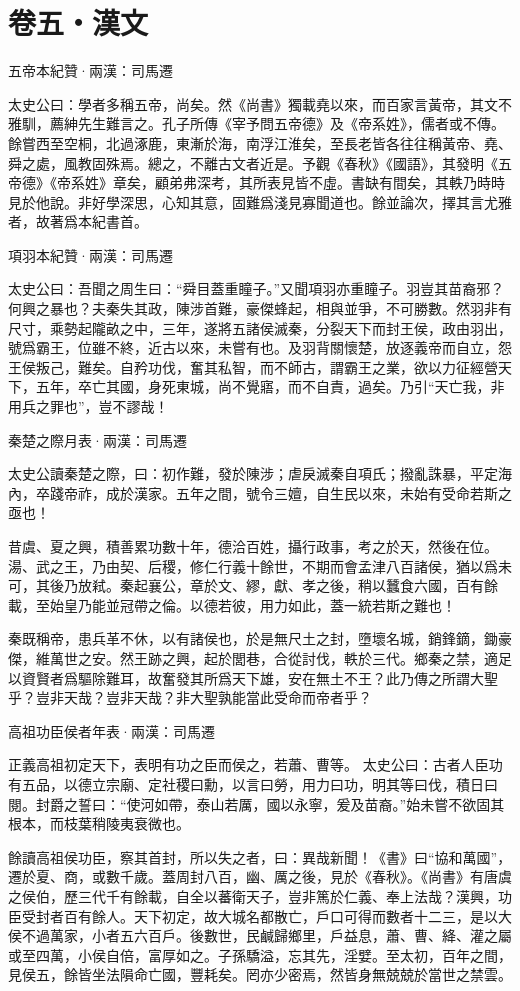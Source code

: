 \documentclass[12pt,a4paper]{ctexbook}
\begin{document}
\section{卷五・漢文}
五帝本紀贊·兩漢：司馬遷 \par
太史公曰：學者多稱五帝，尚矣。然《尚書》獨載堯以來，而百家言黃帝，其文不雅馴，薦紳先生難言之。孔子所傳《宰予問五帝德》及《帝系姓》，儒者或不傳。餘嘗西至空桐，北過涿鹿，東漸於海，南浮江淮矣，至長老皆各往往稱黃帝、堯、舜之處，風教固殊焉。總之，不離古文者近是。予觀《春秋》《國語》，其發明《五帝德》《帝系姓》章矣，顧弟弗深考，其所表見皆不虛。書缺有間矣，其軼乃時時見於他說。非好學深思，心知其意，固難爲淺見寡聞道也。餘並論次，擇其言尤雅者，故著爲本紀書首。\par
項羽本紀贊·兩漢：司馬遷 \par
太史公曰：吾聞之周生曰：“舜目蓋重瞳子。”又聞項羽亦重瞳子。羽豈其苗裔邪？何興之暴也？夫秦失其政，陳涉首難，豪傑蜂起，相與並爭，不可勝數。然羽非有尺寸，乘勢起隴畝之中，三年，遂將五諸侯滅秦，分裂天下而封王侯，政由羽出，號爲霸王，位雖不終，近古以來，未嘗有也。及羽背關懷楚，放逐義帝而自立，怨王侯叛己，難矣。自矜功伐，奮其私智，而不師古，謂霸王之業，欲以力征經營天下，五年，卒亡其國，身死東城，尚不覺寤，而不自責，過矣。乃引“天亡我，非用兵之罪也”，豈不謬哉！\par
秦楚之際月表·兩漢：司馬遷 \par
太史公讀秦楚之際，曰：初作難，發於陳涉；虐戾滅秦自項氏；撥亂誅暴，平定海內，卒踐帝祚，成於漢家。五年之間，號令三嬗，自生民以來，未始有受命若斯之亟也！\par
昔虞、夏之興，積善累功數十年，德洽百姓，攝行政事，考之於天，然後在位。湯、武之王，乃由契、后稷，修仁行義十餘世，不期而會孟津八百諸侯，猶以爲未可，其後乃放弒。秦起襄公，章於文、繆，獻、孝之後，稍以蠶食六國，百有餘載，至始皇乃能並冠帶之倫。以德若彼，用力如此，蓋一統若斯之難也！\par
秦既稱帝，患兵革不休，以有諸侯也，於是無尺土之封，墮壞名城，銷鋒鏑，鋤豪傑，維萬世之安。然王跡之興，起於閭巷，合從討伐，軼於三代。鄉秦之禁，適足以資賢者爲驅除難耳，故奮發其所爲天下雄，安在無土不王？此乃傳之所謂大聖乎？豈非天哉？豈非天哉？非大聖孰能當此受命而帝者乎？\par
高祖功臣侯者年表·兩漢：司馬遷 \par
正義高祖初定天下，表明有功之臣而侯之，若蕭、曹等。 太史公曰：古者人臣功有五品，以德立宗廟、定社稷曰勳，以言曰勞，用力曰功，明其等曰伐，積日曰閱。封爵之誓曰：“使河如帶，泰山若厲，國以永寧，爰及苗裔。”始未嘗不欲固其根本，而枝葉稍陵夷衰微也。\par
餘讀高祖侯功臣，察其首封，所以失之者，曰：異哉新聞！《書》曰“協和萬國”，遷於夏、商，或數千歲。蓋周封八百，幽、厲之後，見於《春秋》。《尚書》有唐虞之侯伯，歷三代千有餘載，自全以蕃衛天子，豈非篤於仁義、奉上法哉？漢興，功臣受封者百有餘人。天下初定，故大城名都散亡，戶口可得而數者十二三，是以大侯不過萬家，小者五六百戶。後數世，民鹹歸鄉里，戶益息，蕭、曹、絳、灌之屬或至四萬，小侯自倍，富厚如之。子孫驕溢，忘其先，淫嬖。至太初，百年之間，見侯五，餘皆坐法隕命亡國，豐耗矣。罔亦少密焉，然皆身無兢兢於當世之禁雲。\par
\end{document}
